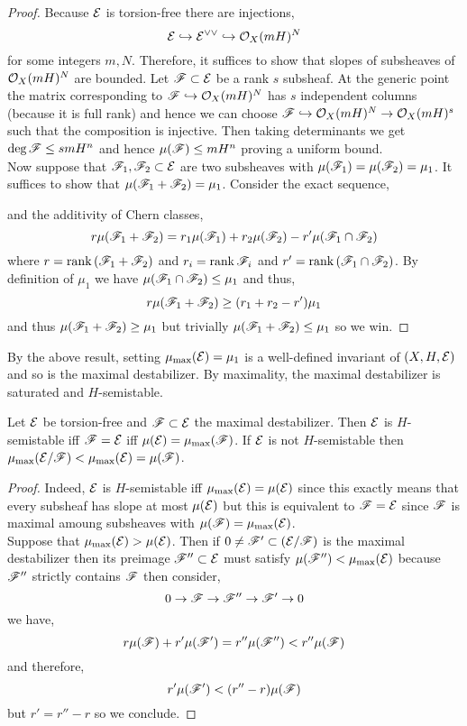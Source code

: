 \documentclass[12pt]{article}
\begin{document}
\begin{proof}
Because $\mathcal{E}$ is torsion-free there are injections,
\[ \mathcal{E} \hookrightarrow \mathcal{E}^{\vee \vee} \hookrightarrow \mathcal{O}_{X}(mH)^N \]
for some integers $m, N$. Therefore, it suffices to show that slopes of subsheaves of $\mathcal{O}_{X}(mH)^N$ are bounded. Let $\mathscr{F} \subset \mathcal{E}$ be a rank $s$ subsheaf. At the generic point the matrix corresponding to $\mathscr{F} \hookrightarrow \mathcal{O}_{X}(mH)^N$ has $s$ independent columns (because it is full rank) and hence we can choose $\mathscr{F} \hookrightarrow \mathcal{O}_{X}(mH)^N \to \mathcal{O}_{X}(mH)^s$ such that the composition is injective. Then taking determinants we get $\deg{\mathscr{F}} \le s m H^n$ and hence $\mu(\mathscr{F}) \le m H^n$ proving a uniform bound.
\bigskip\\
Now suppose that $\mathscr{F}_1, \mathscr{F}_2 \subset \mathcal{E}$ are two subsheaves with $\mu(\mathscr{F}_1) = \mu(\mathscr{F}_2) = \mu_1$. It suffices to show that $\mu(\mathscr{F}_1 + \mathscr{F}_2) = \mu_1$. Consider the exact sequence,
\begin{center}
\end{center}
and the additivity of Chern classes,
\[ r \mu(\mathscr{F}_1 + \mathscr{F}_2) = r_1 \mu(\mathscr{F}_1) + r_2 \mu(\mathscr{F}_2) - r' \mu(\mathscr{F}_1 \cap \mathscr{F}_2) \]
where $r = \operatorname{\mathrm{rank}}{(\mathscr{F}_1 + \mathscr{F}_2)}$ and $r_i = \operatorname{\mathrm{rank}}{\mathscr{F}_i}$ and $r' = \operatorname{\mathrm{rank}}{(\mathscr{F}_1 \cap \mathscr{F}_2)}$. By definition of $\mu_1$ we have $\mu(\mathscr{F}_1 \cap \mathscr{F}_2) \le \mu_1$ and thus,
\[ r \mu(\mathscr{F}_1 + \mathscr{F}_2) \ge (r_1 + r_2 - r') \mu_1 \]
and thus $\mu(\mathscr{F}_1 + \mathscr{F}_2) \ge \mu_1$ but trivially $\mu(\mathscr{F}_1 + \mathscr{F}_2) \le \mu_1$ so we win. 
\end{proof}

\begin{defn}
By the above result, setting $\mu_{\max}(\mathcal{E}) = \mu_1$ is a well-defined invariant of $(X, H, \mathcal{E})$ and so is the maximal destabilizer. By maximality, the maximal destabilizer is saturated and $H$-semistable.  
\end{defn}

\begin{lemma}
Let $\mathcal{E}$ be torsion-free and $\mathscr{F} \subset \mathcal{E}$ the maximal destabilizer. Then $\mathcal{E}$ is $H$-semistable iff $\mathscr{F} = \mathcal{E}$ iff $\mu(\mathcal{E}) = \mu_{\max}(\mathscr{F})$. If $\mathcal{E}$ is not $H$-semistable then $\mu_{\max}(\mathcal{E}/\mathscr{F}) < \mu_{\max}(\mathcal{E}) = \mu(\mathscr{F})$.
\end{lemma}

\begin{proof}
Indeed, $\mathcal{E}$ is $H$-semistable iff $\mu_{\max}(\mathcal{E}) = \mu(\mathcal{E})$ since this exactly means that every subsheaf has slope at most $\mu(\mathcal{E})$ but this is equivalent to $\mathscr{F} = \mathcal{E}$ since $\mathscr{F}$ is maximal amoung subsheaves with $\mu(\mathscr{F}) = \mu_{\max}(\mathcal{E})$. 
\bigskip\\
Suppose that $\mu_{\max}(\mathcal{E}) > \mu(\mathcal{E})$. Then if $0 \neq \mathscr{F}' \subset (\mathcal{E} / \mathscr{F})$ is the maximal destabilizer then its preimage $\mathscr{F}'' \subset \mathcal{E}$ must satisfy $\mu(\mathscr{F}'') < \mu_{\max}(\mathcal{E})$ because $\mathscr{F}''$ strictly contains $\mathscr{F}$ then consider,
\[ 0 \to \mathscr{F} \to \mathscr{F}'' \to \mathscr{F}' \to 0 \]
we have,
\[ r \mu(\mathscr{F}) + r' \mu(\mathscr{F}') = r'' \mu(\mathscr{F}'') < r'' \mu(\mathscr{F}) \]
and therefore,
\[ r' \mu(\mathscr{F}') < (r'' - r) \mu(\mathscr{F}) \]
but $r' = r'' - r$ so we conclude.
\end{proof}
\end{document}
